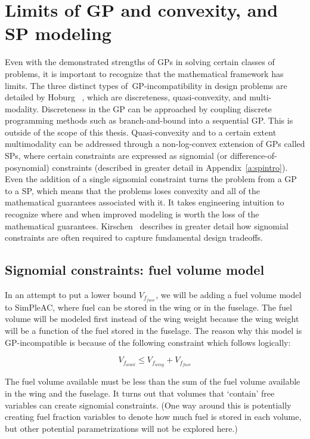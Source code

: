 \section{Limits of GP and convexity, and SP modeling}
\label{s:GPlimits}

Even with the demonstrated strengths of \gls{GP}s in solving certain classes of
problems, it is important to recognize that the mathematical framework has limits.
The three distinct types of~\gls{GP}-incompatibility in design problems are detailed
by Hoburg~ \cite{hoburg_thesis}, which are discreteness,
quasi-convexity, and multi-modality. Discreteness in the \gls{GP} can be approached
by coupling discrete programming methods such as branch-and-bound into a sequential
\gls{GP}. This is outside of the scope of this thesis.
Quasi-convexity and to a certain extent multimodality can
be addressed through a non-log-convex extension of \gls{GP}s called \gls{SP}s, where
certain constraints are expressed as signomial (or difference-of-posynomial) constraints
(described in greater detail in Appendix~\ref{a:spintro}).
Even the addition of a single
signomial constraint turns the problem from a \gls{GP} to a \gls{SP}, which means
that the problems loses convexity and all of the mathematical guarantees associated with it. 
It takes engineering intuition to recognize where and when improved modeling is worth
the loss of the mathematical guarantees. Kirschen~\cite{kirschen_thesis} describes in greater
detail how
signomial constraints are often required to capture fundamental design tradeoffs.

\subsection{Signomial constraints: fuel volume model}
\label{s:fuel}

In an attempt to put a lower bound $V_{f_{fuse}}$, we will
be adding a fuel volume model to SimPleAC, where fuel can be stored in the wing or
in the fuselage. The fuel volume will be modeled first instead of the wing
weight because the wing weight will be a function of the fuel stored in the fuselage.
The reason why this model is \gls{GP}-incompatible is because of the
following constraint which follows logically:

\begin{equation}
	V_{f_{avail}} \leq V_{f_{wing}} + V_{f_{fuse}}
	\label{vfavail}
\end{equation}

The fuel volume available must be less than the sum of the fuel volume available in the
wing and the fuselage. It turns out that volumes that `contain' free variables
can create signomial constraints. (One way around this is potentially creating fuel
fraction variables to denote how much fuel is stored in each volume, but
other potential parametrizations will not be explored here.)


